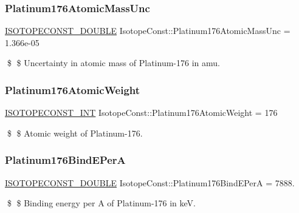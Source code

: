 \subsubsection{\texorpdfstring{Platinum176\+Atomic\+Mass\+Unc}{Platinum176AtomicMassUnc}}
{\footnotesize\ttfamily \mbox{\hyperlink{group___isotope_const-_macros_ga8f45a7272ce02c0b4c65c44636ed719a}{I\+S\+O\+T\+O\+P\+E\+C\+O\+N\+S\+T\+\_\+\+D\+O\+U\+B\+LE}} Isotope\+Const\+::\+Platinum176\+Atomic\+Mass\+Unc = 1.\+366e-\/05}

\$ \$ Uncertainty in atomic mass of Platinum-\/176 in amu. \mbox{\label{group___isotope_const-_platinum-_pt176_ga10bebb6bd896c57779b9db1a9121b775}} 
\subsubsection{\texorpdfstring{Platinum176\+Atomic\+Weight}{Platinum176AtomicWeight}}
{\footnotesize\ttfamily \mbox{\hyperlink{group___isotope_const-_macros_ga5f18360b3e99483a35c32d789e62621c}{I\+S\+O\+T\+O\+P\+E\+C\+O\+N\+S\+T\+\_\+\+I\+NT}} Isotope\+Const\+::\+Platinum176\+Atomic\+Weight = 176}

\$ \$ Atomic weight of Platinum-\/176. \mbox{\label{group___isotope_const-_platinum-_pt176_gabb5fd4dcf9d5b2aef7e028c3fc4a761e}} 
\subsubsection{\texorpdfstring{Platinum176\+Bind\+E\+PerA}{Platinum176BindEPerA}}
{\footnotesize\ttfamily \mbox{\hyperlink{group___isotope_const-_macros_ga8f45a7272ce02c0b4c65c44636ed719a}{I\+S\+O\+T\+O\+P\+E\+C\+O\+N\+S\+T\+\_\+\+D\+O\+U\+B\+LE}} Isotope\+Const\+::\+Platinum176\+Bind\+E\+PerA = 7888.}

\$ \$ Binding energy per A of Platinum-\/176 in keV. \mbox{\label{group___isotope_const-_platinum-_pt176_gac5ee6acffc526535f536ba5af8acce0a}} 

